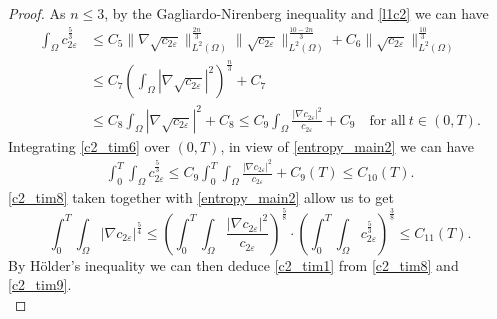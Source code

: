 \documentclass[10pt,a4paper]{amsart}
\begin{document}
\begin{proof}
\noindent
As $n \leq 3$, by the Gagliardo-Nirenberg inequality and \eqref{l1c2} we can have
\begin{align}
\label{c2_tim6}
  \nonumber\int_\Omega c_{2\varepsilon}^{\frac{5}{3}} & \leq C_5 \|\nabla \sqrt{ c_{2\varepsilon}}\|_{L^2(\Omega)}^{\frac{2n}{3}} \|\sqrt{c_{2\varepsilon}}\|^{\frac{10 - 2n}{3}}_{L^2(\Omega)} + C_6 \|\sqrt{c_{2\varepsilon}}\|^{\frac{10}{3}}_{L^2(\Omega)}                   \\[5pt]
  \nonumber  & \leq C_7 \left(\int_\Omega |\nabla \sqrt{ c_{2\varepsilon}}|^2 \right)^{\frac{n}{3}} + C_7   \\[5pt]
  & \leq C_8 \int_\Omega |\nabla \sqrt{ c_{2\varepsilon}}|^2 + C_8 \leq C_9 \int_\Omega \frac{|\nabla c_{2\varepsilon}|^2}{c_{2\varepsilon}} + C_9 \quad \text{for all} ~ t \in (0, T).
\end{align}
Integrating \eqref{c2_tim6} over $(0,T)$, in view of \eqref{entropy_main2} we can have
\begin{align}
  \label{c2_tim8}
  \int_0^T \int_\Omega c_{2\varepsilon}^{\frac{5}{3}}  \leq C_9 \int_0^T \int_\Omega \frac{|\nabla c_{2\varepsilon}|^2}{c_{2\varepsilon}} + C_9(T) \leq C_{10}(T).
\end{align}
\eqref{c2_tim8} taken together with \eqref{entropy_main2} allow us to get
\begin{equation}
\label{c2_tim9}
  \int_0^T \int_\Omega |\nabla c_{2\varepsilon}|^{\frac{5}{4}} \leq \left(\int_0^T \int_\Omega \frac{|\nabla c_{2\varepsilon}|^2}{c_{2\varepsilon}}\right)^{\frac{5}{8}} \cdot \left(\int_0^T \int_\Omega c_{2\varepsilon}^{\frac{5}{3}}\right)^{\frac{3}{8}} \leq C_{11}(T).
\end{equation}
By H\"{o}lder's inequality we can then deduce \eqref{c2_tim1} from \eqref{c2_tim8} and \eqref{c2_tim9}.\\[-2ex]


\end{proof}
\end{document}
